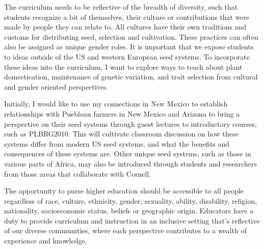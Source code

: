 \documentclass[11pt]{article}
\begin{document}
The curriculum needs to be reflective of the breadth of diversity, such that students recognize a bit of themselves, their culture or contributions that were made by people they can relate to. All cultures have their own traditions and customs for distributing seed, selection and cultivation. These practices can often also be assigned as unique gender roles. It is important that we expose students to ideas outside of the US and western European seed systems. To incorporate these ideas into the curriculum, I want to explore ways to teach about plant domestication, maintenance of genetic variation, and trait selection from cultural and gender oriented perspectives. %




Initially, I would like to use my connections in New Mexico to establish relationships with Puebloan farmers in New Mexico and Arizona to bring a perspective on their seed systems through guest lectures to introductory courses, such as PLBRG2010. This will cultivate classroom discussion on how these systems differ from modern US seed systems, and what the benefits and consequences of these systems are. Other unique seed systems, such as those in various parts of Africa, may also be introduced through students and researchers from those areas that collaborate with Cornell. %


The opportunity to purse higher education should be accessible to all people regardless of race, culture, ethnicity, gender, sexuality, ability, disability, religion, nationality, socioeconomic status, beliefs or geographic origin. Educators have a duty to provide curriculum and instruction in an inclusive setting that's reflective of our diverse communities, where each perspective contributes to a wealth of experience and knowledge. %
\end{document}
